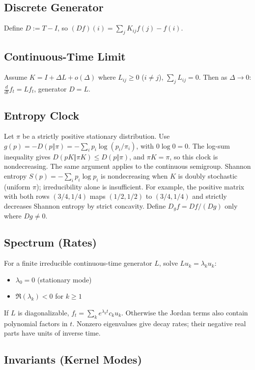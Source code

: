 \documentclass[12pt, oneside]{article}
\begin{document}
\subsection{Discrete Generator}

Define $D := T - I$, so $(Df)(i) = \sum_j K_{ij} f(j) - f(i)$.

\subsection{Continuous-Time Limit}

Assume $K = I + \Delta L + o(\Delta)$ where $L_{ij} \geq 0$ ($i \neq j$), $\sum_j L_{ij} = 0$. Then as $\Delta \to 0$: $\frac{d}{dt} f_t = L f_t$, generator $D = L$.

\subsection{Entropy Clock}

Let $\pi$ be a strictly positive stationary distribution. Use $g(p)=-D(p\Vert\pi)=-\sum_i p_i\log(p_i/\pi_i)$, with $0\log0=0$. The log-sum inequality gives $D(pK\Vert\pi K)\le D(p\Vert\pi)$, and $\pi K=\pi$, so this clock is nondecreasing. The same argument applies to the continuous semigroup. Shannon entropy $S(p)=-\sum_i p_i\log p_i$ is nondecreasing when $K$ is doubly stochastic (uniform $\pi$); irreducibility alone is insufficient. For example, the positive matrix with both rows $(3/4,1/4)$ maps $(1/2,1/2)$ to $(3/4,1/4)$ and strictly decreases Shannon entropy by strict concavity. Define $D_g f=Df/(Dg)$ only where $Dg\ne0$.

\subsection{Spectrum (Rates)}

For a finite irreducible continuous-time generator $L$, solve $L u_k = \lambda_k u_k$:
\begin{itemize}
    \item $\lambda_0 = 0$ (stationary mode)
    \item $\Re(\lambda_k) < 0$ for $k \geq 1$
\end{itemize}
If $L$ is diagonalizable, $f_t=\sum_k e^{\lambda_k t}c_k u_k$. Otherwise the Jordan terms also contain polynomial factors in $t$. Nonzero eigenvalues give decay rates; their negative real parts have units of inverse time.

\subsection{Invariants (Kernel Modes)}
\end{document}
